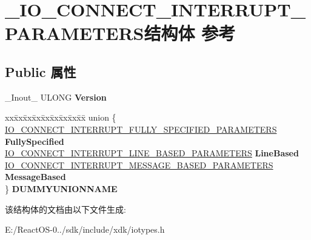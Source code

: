 \hypertarget{struct___i_o___c_o_n_n_e_c_t___i_n_t_e_r_r_u_p_t___p_a_r_a_m_e_t_e_r_s}{}\section{\+\_\+\+I\+O\+\_\+\+C\+O\+N\+N\+E\+C\+T\+\_\+\+I\+N\+T\+E\+R\+R\+U\+P\+T\+\_\+\+P\+A\+R\+A\+M\+E\+T\+E\+R\+S结构体 参考}
\label{struct___i_o___c_o_n_n_e_c_t___i_n_t_e_r_r_u_p_t___p_a_r_a_m_e_t_e_r_s}
\subsection*{Public 属性}
\begin{DoxyCompactItemize}
\item 
\mbox{\label{struct___i_o___c_o_n_n_e_c_t___i_n_t_e_r_r_u_p_t___p_a_r_a_m_e_t_e_r_s_ad2568d48fbaf9953a8bc38c68567ce19}} 
\+\_\+\+Inout\+\_\+ U\+L\+O\+NG {\bfseries Version}
\item 
\mbox{\label{struct___i_o___c_o_n_n_e_c_t___i_n_t_e_r_r_u_p_t___p_a_r_a_m_e_t_e_r_s_a38f625b540b7492d6316a7a60fc3632c}} 
\begin{tabbing}
xx\=xx\=xx\=xx\=xx\=xx\=xx\=xx\=xx\=\kill
union \{\\
\>\hyperlink{struct___i_o___c_o_n_n_e_c_t___i_n_t_e_r_r_u_p_t___f_u_l_l_y___s_p_e_c_i_f_i_e_d___p_a_r_a_m_e_t_e_r_s}{IO\_CONNECT\_INTERRUPT\_FULLY\_SPECIFIED\_PARAMETERS} {\bfseries FullySpecified}\\
\>\hyperlink{struct___i_o___c_o_n_n_e_c_t___i_n_t_e_r_r_u_p_t___l_i_n_e___b_a_s_e_d___p_a_r_a_m_e_t_e_r_s}{IO\_CONNECT\_INTERRUPT\_LINE\_BASED\_PARAMETERS} {\bfseries LineBased}\\
\>\hyperlink{struct___i_o___c_o_n_n_e_c_t___i_n_t_e_r_r_u_p_t___m_e_s_s_a_g_e___b_a_s_e_d___p_a_r_a_m_e_t_e_r_s}{IO\_CONNECT\_INTERRUPT\_MESSAGE\_BASED\_PARAMETERS} {\bfseries MessageBased}\\
\} {\bfseries DUMMYUNIONNAME}\\

\end{tabbing}\end{DoxyCompactItemize}


该结构体的文档由以下文件生成\+:\begin{DoxyCompactItemize}
\item 
E\+:/\+React\+O\+S-\/0../sdk/include/xdk/iotypes.\+h\end{DoxyCompactItemize}
